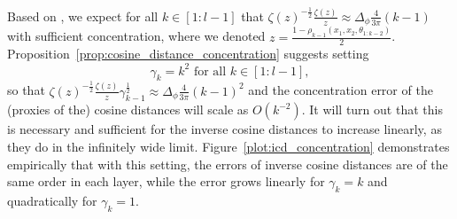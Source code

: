 \documentclass[twoside,11pt]{article}
\begin{document}
\begin{remark}\label{rem:optimal_gammas}~\\
Based on \citet[Proposition~13]{mlpsateoc1}, we expect for all $k \in [1:l-1]$ that $\zeta(z)^{-\frac{1}{2}} \frac{\zeta(z)}{z} \approx \Delta_\phi \frac{4}{3\pi} (k-1)$ with sufficient concentration, where we denoted $z = \frac{1 - \rho_{k-1}(x_1,x_2,\theta_{1:k-2})}{2}$.  Proposition~\ref{prop:cosine_distance_concentration} suggests setting
\begin{equation}\label{eq:optimal_gammas}
\gamma_k = k^2 \text{ for all } k \in [1:l-1],
\end{equation}
so that $\zeta(z)^{-\frac{1}{2}} \frac{\zeta(z)}{z} \gamma_{k-1}^{\frac{1}{2}} \approx \Delta_\phi \frac{4}{3\pi} (k-1)^2$ and the concentration error of the (proxies of the) cosine distances will scale as $O(k^{-2})$. It will turn out that this is necessary and sufficient for the inverse cosine distances to increase linearly, as they do in the infinitely wide limit. Figure~\ref{plot:icd_concentration} demonstrates empirically that with this setting, the errors of inverse cosine distances are of the same order in each layer, while the error grows linearly for $\gamma_k=k$ and quadratically for $\gamma_k=1$.
\end{remark}
\end{document}
